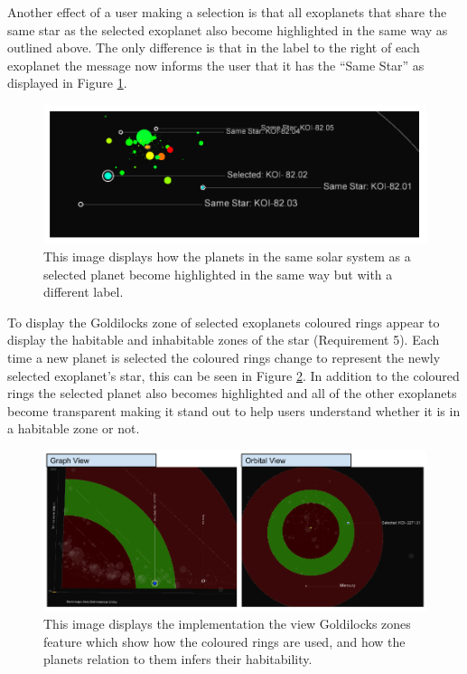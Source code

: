 Another effect of a user making a selection is that all exoplanets that share
the same star as the selected exoplanet also become highlighted in the
same way as outlined above. The only difference is that in the label to the
right
of each exoplanet the message now informs the user that it has the ``Same
Star'' as displayed in Figure \ref{fig:sameStar}.

\begin{figure}[H]
  \centering
      \includegraphics[width=1\textwidth]{images/sameStar.png}
  \caption[Implementation of exoplanets in the same solar system]{This image
displays how the planets in the same solar system as a selected planet become
highlighted in the same way but with a different label.}  
    \label{fig:sameStar}
\end{figure}


To display the Goldilocks zone of selected exoplanets coloured rings appear to
display the habitable
and inhabitable zones of the star (Requirement 5). Each time a new planet is
selected the
coloured rings change to represent the newly selected exoplanet's star, this can
be seen in Figure
\ref{fig:habitable}. In addition to the coloured rings the selected planet also
becomes highlighted
and all of the other exoplanets become transparent making it stand out to help users understand
whether it is in a habitable zone or not.

\begin{figure}[H]
  \centering
      \includegraphics[width=1\textwidth]{images/habitable.png}
  \caption[Implementation of Goldilocks zones]{This image displays the
implementation the view Goldilocks zones feature which show how the coloured
rings are used, and how the planets relation to them infers their habitability.}
  
    \label{fig:habitable}
\end{figure}

